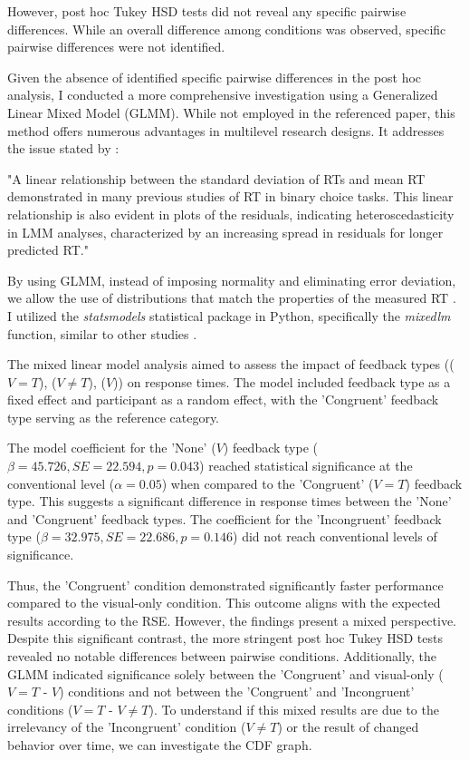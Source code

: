 \documentclass[12pt,oneside,openright]{report}
\begin{document}
However, post hoc Tukey HSD tests did not reveal any specific pairwise differences. While an overall difference among conditions was observed, specific pairwise differences were not identified.

Given the absence of identified specific pairwise differences in the post hoc analysis, I conducted a more comprehensive investigation using a Generalized Linear Mixed Model (GLMM). While not employed in the referenced paper, this method offers numerous advantages in multilevel research designs. It addresses the issue stated by \textcite{Lo2015-fv}: 

"A linear relationship between the standard deviation of RTs and mean RT demonstrated in many previous studies of RT in binary choice tasks. This linear relationship is also evident in plots of the residuals, indicating heteroscedasticity in LMM analyses, characterized by an increasing spread in residuals for longer predicted RT."

By using GLMM, instead of imposing normality and eliminating error deviation, we allow the use of distributions that match the properties of the measured RT \parencite{Lo2015-fv}. I utilized the \textit{statsmodels} statistical package in Python, specifically the \textit{mixedlm} function, similar to other studies \parencite{RSE_FBI}.

The mixed linear model analysis aimed to assess the impact of feedback types (($V=T$), ($V \neq T$), ($V$)) on response times. The model included feedback type as a fixed effect and participant as a random effect, with the 'Congruent' feedback type serving as the reference category.

The model coefficient for the 'None' ($V$) feedback type ($\beta = 45.726, SE = 22.594, p = 0.043$) reached statistical significance at the conventional level ($\alpha =0.05 $) when compared to the 'Congruent' ($V=T$) feedback type. This suggests a significant difference in response times between the 'None' and 'Congruent' feedback types. The coefficient for the 'Incongruent' feedback type ($\beta = 32.975, SE = 22.686, p = 0.146$) did not reach conventional levels of significance.

Thus, the 'Congruent' condition demonstrated significantly faster performance compared to the visual-only condition. This outcome aligns with the expected results according to the RSE. However, the findings present a mixed perspective. Despite this significant contrast, the more stringent post hoc Tukey HSD tests revealed no notable differences between pairwise conditions. Additionally, the GLMM indicated significance solely between the 'Congruent' and visual-only ($V=T$ - $V$) conditions and not between the 'Congruent' and 'Incongruent' conditions ($V=T$ - $V \neq T$). To understand if this mixed results are due to the irrelevancy of the 'Incongruent' condition ($V \neq T$) or the result of changed behavior over time, we can investigate the CDF graph.
\end{document}
